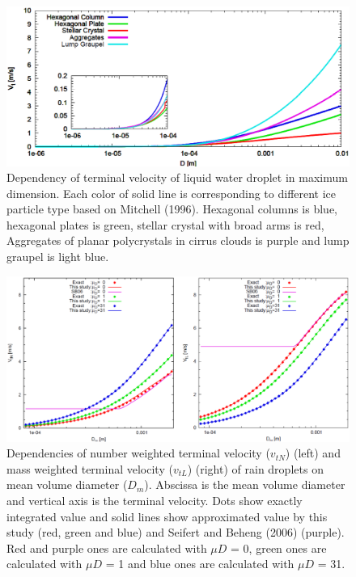 \begin{figure}[]
\begin{center}
\includegraphics[scale=0.3]{./figure/D_vt_sn13-ice.eps}
\end{center}
\caption{Dependency of terminal velocity of liquid water droplet in maximum dimension. Each color of solid line is corresponding to different ice particle type based on Mitchell (1996). Hexagonal columns is blue, hexagonal plates is green, stellar crystal with broad arms is red, Aggregates of planar polycrystals in cirrus clouds is purple and lump graupel is light blue.}
\label{figsn2-12}
\end{figure}

\begin{figure}[]
\begin{center}
\includegraphics[scale=0.4]{./figure/D_vt_sn13-1.eps}
\end{center}
\caption{Dependencies of number weighted terminal velocity ($v_{tN}$) (left) and mass weighted terminal velocity ($v_{tL}$) (right) of rain droplets on mean volume diameter ($D_{m}$). Abscissa is the mean volume diameter and vertical axis is the terminal velocity. Dots show exactly integrated value and solid lines show approximated value by this study (red, green and blue) and Seifert and Beheng (2006) (purple). Red and purple ones are calculated with $\mu D$ = 0, green ones are calculated with $\mu D$ = 1 and blue ones are calculated with $\mu D$ = 31.}
\label{figsn2-13}
\end{figure}

